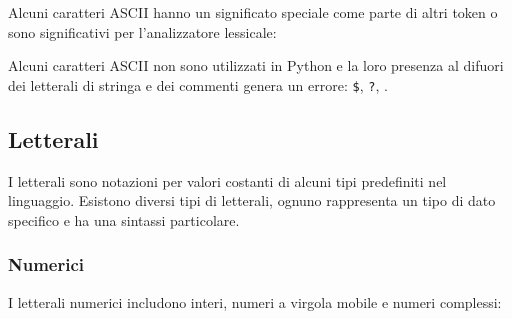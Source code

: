 \documentclass[
  letterpaper,
]{scrbook}
\newcommand{\VERB}{\Verb[commandchars=\\\{\}]}
\newcommand{\CommentTok}[1]{\textcolor[rgb]{0.37,0.37,0.37}{#1}}
\newcommand{\OperatorTok}[1]{\textcolor[rgb]{0.37,0.37,0.37}{#1}}
\begin{document}
Alcuni caratteri ASCII hanno un significato speciale come parte di altri
token o sono significativi per l'analizzatore lessicale:


Alcuni caratteri ASCII non sono utilizzati in Python e la loro presenza
al difuori dei letterali di stringa e dei commenti genera un errore:
\texttt{\$}, \texttt{?}, \texttt{\textasciigrave{}}.

\subsection{Letterali}\label{letterali}

I letterali sono notazioni per valori costanti di alcuni tipi
predefiniti nel linguaggio. Esistono diversi tipi di letterali, ognuno
rappresenta un tipo di dato specifico e ha una sintassi particolare.

\subsubsection{Numerici}\label{numerici}

I letterali numerici includono interi, numeri a virgola mobile e numeri
complessi:
\end{document}
